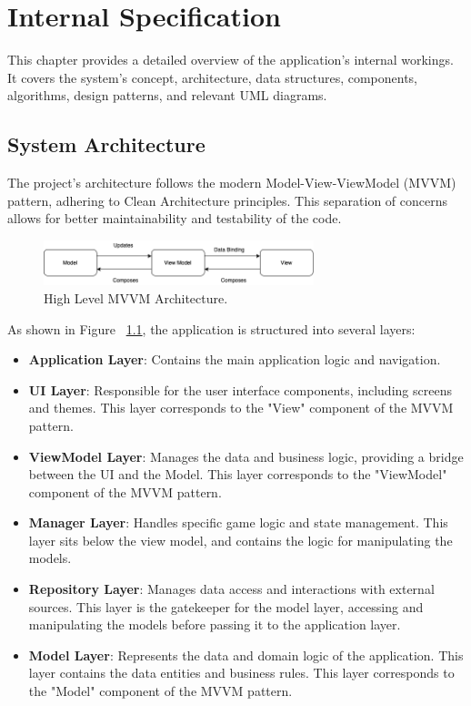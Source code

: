 \chapter{Internal Specification}
\label{chap:internal-specifications}

This chapter provides a detailed overview of the application's internal workings. It covers the system's concept, architecture, data structures, components, algorithms, design patterns, and relevant UML diagrams.

\section{System Architecture}

The project's architecture follows the modern Model-View-ViewModel (MVVM) pattern, adhering to Clean Architecture principles. This separation of concerns allows for better maintainability and testability of the code.

\begin{figure}[ht!]
    \centering
    \includegraphics[width=0.7\textwidth]{img/mvvm_explanation.png}
    \caption{High Level MVVM Architecture.}
    \label{fig:mvvm_explanation}
\end{figure}

As shown in Figure ~\ref{fig:mvvm_explanation}, the application is structured into several layers:

\begin{itemize}
    \item \textbf{Application Layer}: Contains the main application logic and navigation.
    \item \textbf{UI Layer}: Responsible for the user interface components, including screens and themes. This layer corresponds to the "View" component of the MVVM pattern.
    \item \textbf{ViewModel Layer}: Manages the data and business logic, providing a bridge between the UI and the Model. This layer corresponds to the "ViewModel" component of the MVVM pattern.
    \item \textbf{Manager Layer}: Handles specific game logic and state management. This layer sits below the view model, and contains the logic for manipulating the models.
    \item \textbf{Repository Layer}: Manages data access and interactions with external sources. This layer is the gatekeeper for the model layer, accessing and manipulating the models before passing it to the application layer.
    \item \textbf{Model Layer}: Represents the data and domain logic of the application. This layer contains the data entities and business rules. This layer corresponds to the "Model" component of the MVVM pattern.
\end{itemize}


